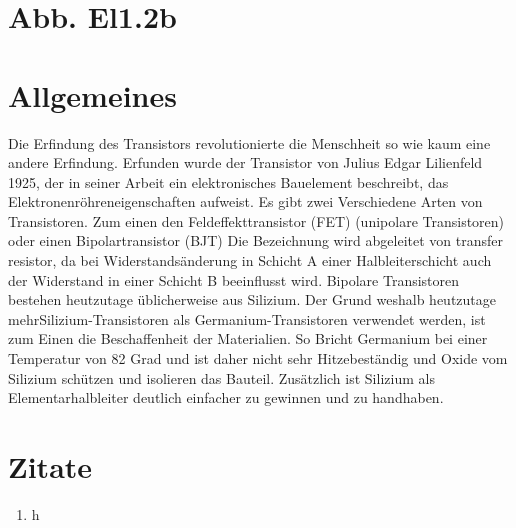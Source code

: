 \section{Abb. El1.2b}

\section{Allgemeines}
Die Erfindung des Transistors revolutionierte die Menschheit so wie kaum eine andere
Erfindung.
Erfunden wurde der Transistor von Julius Edgar Lilienfeld 1925, der in seiner Arbeit ein
elektronisches Bauelement beschreibt, das Elektronenröhreneigenschaften aufweist.
Es gibt zwei Verschiedene Arten von Transistoren. Zum einen den Feldeffekttransistor (FET)
(unipolare Transistoren) oder einen Bipolartransistor (BJT)
Die Bezeichnung wird abgeleitet von transfer resistor, da bei Widerstandsänderung in Schicht A
einer Halbleiterschicht auch der Widerstand in einer Schicht B beeinflusst wird.
Bipolare Transistoren bestehen heutzutage üblicherweise aus Silizium. Der Grund weshalb heutzutage mehrSilizium-Transistoren als Germanium-Transistoren verwendet werden, ist zum Einen  die Beschaffenheit der Materialien. So Bricht Germanium bei einer Temperatur von 82 Grad und ist daher nicht sehr Hitzebest\"andig und Oxide vom Silizium sch\"utzen und isolieren das Bauteil. Zus\"atzlich ist Silizium als Elementarhalbleiter deutlich einfacher zu gewinnen und zu handhaben. 


\section{Zitate}
\begin{enumerate} 
\item h
\end{enumerate}